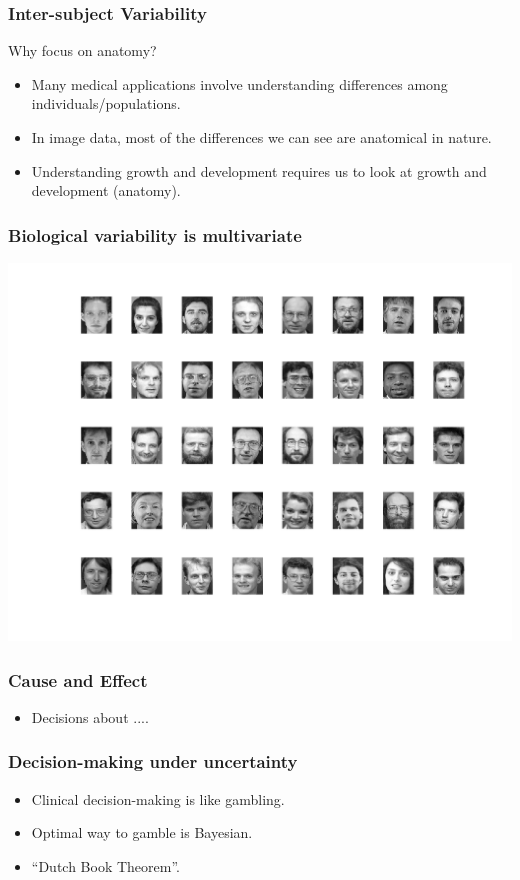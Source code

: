\begin{frame}
\frametitle{Inter-subject Variability}
Why focus on anatomy?
\begin{itemize}
\item{Many medical applications involve understanding differences among individuals/populations.}
\item{In image data, most of the differences we can see are anatomical in nature.}
\item{Understanding growth and development requires us to look at growth and development (anatomy).}
\end{itemize}
\end{frame}

\begin{frame}
\frametitle{Biological variability is multivariate}
\begin{center}
\includegraphics[height=0.7\textwidth]{faces}
\end{center}
\end{frame}

\begin{frame}
\frametitle{Cause and Effect}
\begin{itemize}
\item Decisions about ....
\end{itemize}
\end{frame}

\begin{frame}
\frametitle{Decision-making under uncertainty}
\begin{itemize}
\item Clinical decision-making is like gambling.
\item Optimal way to gamble is Bayesian.
\item ``Dutch Book Theorem''.
\end{itemize}
\end{frame}

